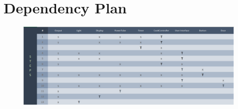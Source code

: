 \section{Dependency Plan}

\begin{figure}[H]
	\centering
	\includegraphics[width=1\linewidth]{../Diagrams/IntegrationPlan}
	\caption[Integration Plan]{}
	\label{fig:integrationplan}
\end{figure}
